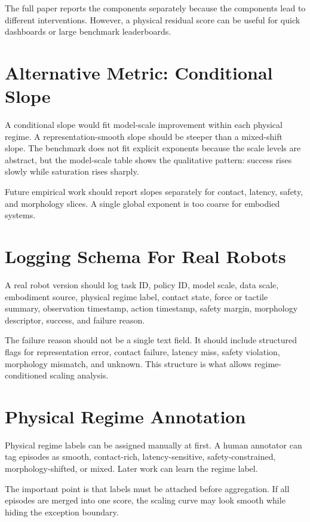 The full paper reports the components separately because the components lead to different interventions. However, a physical residual score can be useful for quick dashboards or large benchmark leaderboards.

\section{Alternative Metric: Conditional Slope}

A conditional slope would fit model-scale improvement within each physical regime. A representation-smooth slope should be steeper than a mixed-shift slope. The benchmark does not fit explicit exponents because the scale levels are abstract, but the model-scale table shows the qualitative pattern: success rises slowly while saturation rises sharply.

Future empirical work should report slopes separately for contact, latency, safety, and morphology slices. A single global exponent is too coarse for embodied systems.

\section{Logging Schema For Real Robots}

A real robot version should log task ID, policy ID, model scale, data scale, embodiment source, physical regime label, contact state, force or tactile summary, observation timestamp, action timestamp, safety margin, morphology descriptor, success, and failure reason.

The failure reason should not be a single text field. It should include structured flags for representation error, contact failure, latency miss, safety violation, morphology mismatch, and unknown. This structure is what allows regime-conditioned scaling analysis.

\section{Physical Regime Annotation}

Physical regime labels can be assigned manually at first. A human annotator can tag episodes as smooth, contact-rich, latency-sensitive, safety-constrained, morphology-shifted, or mixed. Later work can learn the regime label.

The important point is that labels must be attached before aggregation. If all episodes are merged into one score, the scaling curve may look smooth while hiding the exception boundary.

